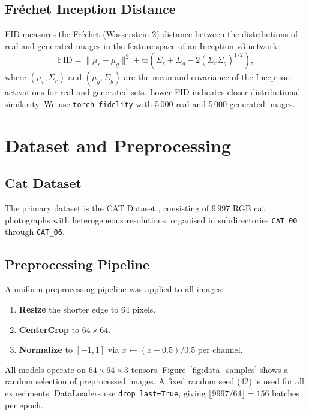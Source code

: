 \documentclass[12pt,a4paper]{article}
\begin{document}
\subsection{Fr\'{e}chet Inception Distance}

FID \cite{fid} measures the Fr\'{e}chet (Wasserstein-2) distance between the
distributions of real and generated images in the feature space of an
Inception-v3 network:
\begin{equation}
  \mathrm{FID} = \|\mu_r - \mu_g\|^2
               + \mathrm{tr}(\Sigma_r + \Sigma_g - 2(\Sigma_r \Sigma_g)^{1/2}),
\end{equation}
where $(\mu_r, \Sigma_r)$ and $(\mu_g, \Sigma_g)$ are the mean and covariance
of the Inception activations for real and generated sets.  Lower FID indicates
closer distributional similarity.  We use \texttt{torch-fidelity} with 5\,000
real and 5\,000 generated images.

\section{Dataset and Preprocessing}
\label{sec:data}

\subsection{Cat Dataset}
The primary dataset is the CAT Dataset \cite{catdataset}, consisting of
$9\,997$ RGB cat photographs with heterogeneous resolutions, organised in
subdirectories \texttt{CAT\_00} through \texttt{CAT\_06}.

\subsection{Preprocessing Pipeline}
A uniform preprocessing pipeline was applied to all images:

\begin{enumerate}[noitemsep]
  \item \textbf{Resize} the shorter edge to $64$ pixels.
  \item \textbf{CenterCrop} to $64 \times 64$.
  \item \textbf{Normalize} to $[-1, 1]$ via
        $x \leftarrow (x - 0.5) / 0.5$ per channel.
\end{enumerate}

All models operate on $64 \times 64 \times 3$ tensors.
Figure~\ref{fig:data_samples} shows a random selection of preprocessed images.
A fixed random seed (42) is used for all experiments.  DataLoaders use
\texttt{drop\_last=True}, giving $\lfloor 9997 / 64 \rfloor = 156$ batches
per epoch.
\end{document}
